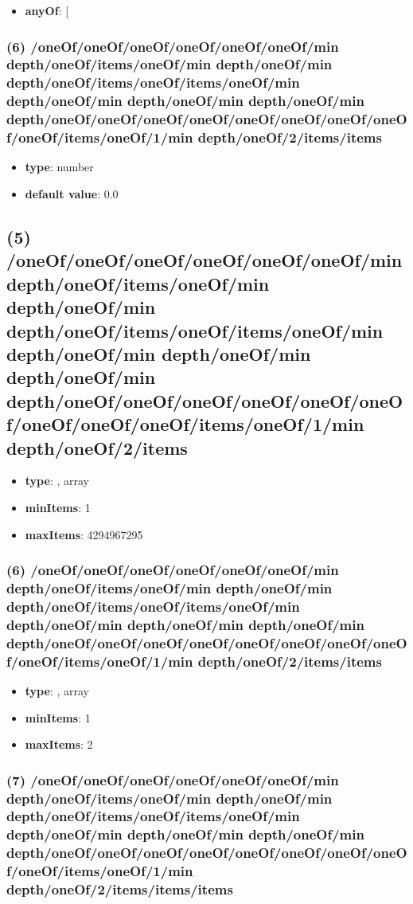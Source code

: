 \begin{itemize}[leftmargin=6em]\item {\bf anyOf}: [\end{itemize}\subsubsection{(6) /oneOf/oneOf/oneOf/oneOf/oneOf/oneOf/min depth/oneOf/items/oneOf/min depth/oneOf/min depth/oneOf/items/oneOf/items/oneOf/min depth/oneOf/min depth/oneOf/min depth/oneOf/min depth/oneOf/oneOf/oneOf/oneOf/oneOf/oneOf/oneOf/oneOf/oneOf/items/oneOf/1/min depth/oneOf/2/items/items}
\begin{itemize}[leftmargin=6em]\item {\bf type}: number\item {\bf default value}: 0.0
\end{itemize}\subsection{(5) /oneOf/oneOf/oneOf/oneOf/oneOf/oneOf/min depth/oneOf/items/oneOf/min depth/oneOf/min depth/oneOf/items/oneOf/items/oneOf/min depth/oneOf/min depth/oneOf/min depth/oneOf/min depth/oneOf/oneOf/oneOf/oneOf/oneOf/oneOf/oneOf/oneOf/oneOf/items/oneOf/1/min depth/oneOf/2/items}
\begin{itemize}[leftmargin=5em]\item {\bf type}: , array\item {\bf minItems}: 1
\item {\bf maxItems}: 4294967295
\end{itemize}\subsubsection{(6) /oneOf/oneOf/oneOf/oneOf/oneOf/oneOf/min depth/oneOf/items/oneOf/min depth/oneOf/min depth/oneOf/items/oneOf/items/oneOf/min depth/oneOf/min depth/oneOf/min depth/oneOf/min depth/oneOf/oneOf/oneOf/oneOf/oneOf/oneOf/oneOf/oneOf/oneOf/items/oneOf/1/min depth/oneOf/2/items/items}
\begin{itemize}[leftmargin=6em]\item {\bf type}: , array\item {\bf minItems}: 1
\item {\bf maxItems}: 2
\end{itemize}\subsubsection{(7) /oneOf/oneOf/oneOf/oneOf/oneOf/oneOf/min depth/oneOf/items/oneOf/min depth/oneOf/min depth/oneOf/items/oneOf/items/oneOf/min depth/oneOf/min depth/oneOf/min depth/oneOf/min depth/oneOf/oneOf/oneOf/oneOf/oneOf/oneOf/oneOf/oneOf/oneOf/items/oneOf/1/min depth/oneOf/2/items/items/items}
